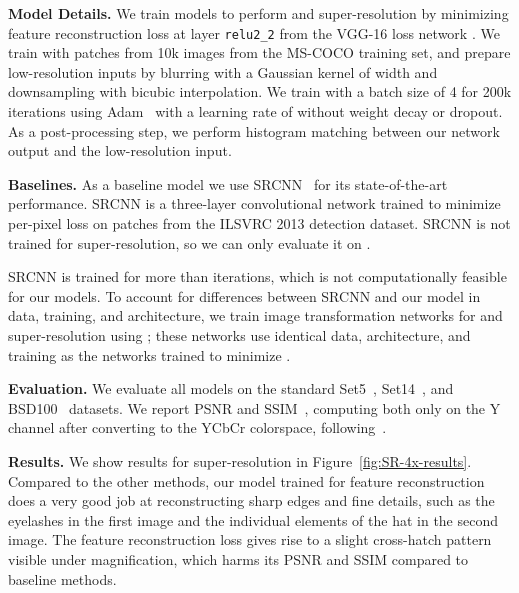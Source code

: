 \documentclass[runningheads]{llncs}
\begin{document}
\vspace{1mm}
\noindent \textbf{Model Details.}
We train models to perform  and  super-resolution by minimizing feature
reconstruction loss at layer \verb.relu2_2. from the VGG-16 loss network . We train with
 patches from 10k images from the MS-COCO training set, and prepare low-resolution
inputs by blurring with a Gaussian kernel of width  and downsampling with bicubic
interpolation. We train with a batch size of 4 for 200k iterations using Adam~\cite{kingma2014adam}
with a learning rate of  without weight decay or dropout. As a post-processing step,
we perform histogram matching between our network output and the low-resolution input.

\vspace{1mm}
\noindent \textbf{Baselines.}
As a baseline model we use SRCNN~\cite{dong2015image} for its state-of-the-art performance. SRCNN
is a three-layer convolutional network trained to minimize per-pixel loss on 
patches from the ILSVRC 2013 detection dataset. SRCNN is not trained for  super-resolution,
so we can only evaluate it on .

SRCNN is trained for more than  iterations, which is not computationally feasible for our
models. To account for differences between SRCNN and our model in data, training, and architecture,
we train image transformation networks for  and  super-resolution using
; these networks use identical data, architecture, and training as the networks trained
to minimize .






\vspace{1mm}
\noindent \textbf{Evaluation.}
We evaluate all models on the standard Set5~\cite{bevilacqua2012low},
Set14~\cite{zeyde2010single}, and BSD100~\cite{huang2015single} datasets. We report PSNR and
SSIM~\cite{wang2004image}, computing both only on the Y channel after converting to the YCbCr
colorspace, following~\cite{dong2015image,timofte2014adjusted}.




\vspace{1mm}
\noindent \textbf{Results.}
We show results for  super-resolution in Figure~\ref{fig:SR-4x-results}.
Compared to the other methods, our model trained for feature reconstruction does a very good job
at reconstructing sharp edges and fine details, such as the eyelashes in the first image and the
individual elements of the hat in the second image. The feature reconstruction loss gives rise to
a slight cross-hatch pattern visible under magnification, which harms its PSNR and SSIM compared
to baseline methods.
\end{document}
